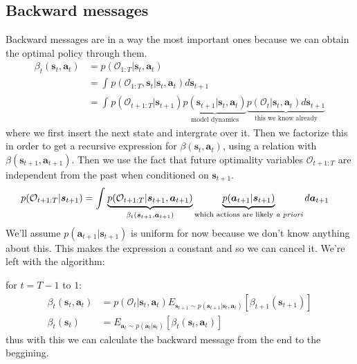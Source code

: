 \documentclass{report}
\begin{document}
\subsection{Backward messages}
Backward messages are in a way the most important ones because we can obtain the optimal policy through them.
\begin{align}
\beta_{ t } (\bm{s}_{t}, \bm{a}_{t} ) &= p (\mathcal{O}_{ 1:T }|\bm{s}_{t}, \bm{a}_{t})\\
&= \int_{}^{} p (\mathcal{O}_{ 1:T }, \bm{s}_{t} | \bm{s}_{t}, \bm{a}_{t}) d\bm{s}_{t+1}\\
&= \int_{}^{} p (\mathcal{O}_{ t+1:T }| \bm{s}_{t+1}) 
\underbrace{p (\bm{s}_{t+1}| \bm{s}_{t}, \bm{a}_{t}) }_{ \text{model dynamics} }
\underbrace{p (\mathcal{O}_{ t }| \bm{s}_{t}, \bm{a}_{t}) d\bm{s}_{t+1}}_{ \text{this we know already} }
\end{align}
where we first insert the next state and intergrate over it.
Then we factorize this in order to get a recursive expression for $ \beta (\bm{s}_{t}, \bm{a}_{t} )  $, using
a relation with $ \beta (\bm{s}_{t+1}, \bm{a}_{t+1} )  $.
Then we use the fact that future optimality variables $ \mathcal{O}_{ t+1:T }  $
are independent from the past when conditioned on $ \bm{s}_{t+1}  $.
\begin{align}
p (\mathcal{O}_{ t+1:T }|\bm{s}_{t+1}) &= \int_{}^{} 
\underbrace{p (\mathcal{O}_{ t+1:T }| \bm{s}_{t+1}, \bm{a}_{t+1}) }_{ \beta_{ t } (\bm{s}_{t+1}, \bm{a}_{t+1} ) }
\underbrace{p (\bm{a}_{t+1}| \bm{s}_{t+1} ) }_{ \text{which actions are likely \textit{a priori}} }
d \bm{a}_{t+1}
\end{align}
We'll assume $ p (\bm{a}_{t+1}| \bm{s}_{t+1} )  $ is uniform for now
because we don't know anything about this.
This makes the expression a constant and so we can cancel it.
We're left with the algorithm:

for $ t = T -1  $ to $ 1  $:
\begin{align}
\beta_{ t } (\bm{s}_{t}, \bm{a}_{t} ) &= p (\mathcal{O}_{ t } | \bm{s}_{t}, \bm{a}_{t}) 
E_{ \bm{s}_{t+1} \sim p (\bm{s}_{t+1} | \bm{s}_{t}, \bm{a}_{t}) } \left[ \beta_{ t+1 } (\bm{s}_{t+1}) \right] \\
\beta_{ t } (\bm{s}_{t}) &=
E_{ \bm{a}_{t} \sim p (\bm{a}_{t}| \bm{s}_{t} ) } \left[ \beta_{ t } (\bm{s}_{t}, \bm{a}_{t} ) \right] 
\end{align}
thus with this we can calculate the backward message from the end to the beggining.
\end{document}
